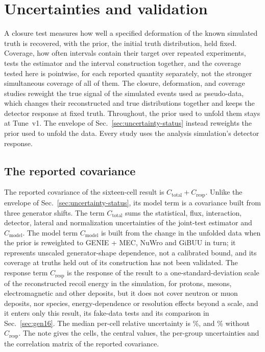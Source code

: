 \section{Uncertainties and validation}
\label{sec:validation}

A closure test measures how well a specified deformation of the known simulated truth is recovered, with the
prior, the initial truth distribution, held fixed.
Coverage, how often intervals contain their target over repeated experiments, tests the estimator and the interval
construction together, and the coverage tested here is pointwise, for each reported quantity separately, not the
stronger simultaneous coverage of all of them.
The closure, deformation, and coverage studies reweight the true signal of the simulated events used as
pseudo-data, which changes their reconstructed and true distributions together and keeps the detector response at
fixed truth.
Throughout, the prior used to unfold them stays at Tune~v1.
The envelope of Sec.~\ref{sec:uncertainty-status} instead reweights the prior used to unfold the data.
Every study uses the analysis simulation's detector response.

\subsection{The reported covariance}
\label{sec:cov16}

The reported covariance of the sixteen-cell result is $C_{\mathrm{total}}+C_{\mathrm{resp}}$.
Unlike the envelope of Sec.~\ref{sec:uncertainty-status}, its model term is a covariance built from three generator
shifts.
The term $C_{\mathrm{total}}$ sums the statistical, flux, interaction, detector, lateral and normalization
uncertainties of the joint-test estimator and $C_{\mathrm{model}}$.
The model term $C_{\mathrm{model}}$ is built from the change in the unfolded data when the prior is reweighted to
GENIE + MEC, NuWro and GiBUU in turn; it represents unscaled generator-shape dependence, not a calibrated bound, and
its coverage at truths held out of its construction has not been validated.
The response term $C_{\mathrm{resp}}$ is the response of the result to a one-standard-deviation scale of the
reconstructed recoil energy in the simulation, for protons, mesons, electromagnetic and other deposits, but it does not cover neutron or muon deposits, nor
species, energy-dependence or resolution effects beyond a scale, and it enters only this result, its fake-data tests
and its comparison in Sec.~\ref{sec:gen16}.
The median per-cell relative uncertainty is \%, and \% without
$C_{\mathrm{resp}}$.
The note gives the cells, the central values, the per-group uncertainties and the correlation matrix of the
reported covariance.

